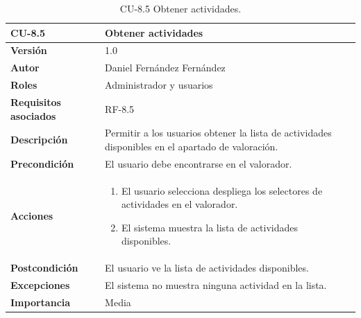 \begin{table}[p]
        \centering
        \begin{tabularx}{\linewidth}{ p{} p{} }
            \toprule
            \textbf{CU-8.5} & \textbf{Obtener actividades}\\
            \toprule
            \textbf{Versión} & 1.0 \\
            \textbf{Autor} & Daniel Fernández Fernández \\
            \textbf{Roles} & Administrador y usuarios \\
            \textbf{Requisitos asociados} & RF-8.5 \\
            \textbf{Descripción} & Permitir a los usuarios obtener la lista de actividades disponibles en el apartado de valoración. \\
            \textbf{Precondición} & El usuario debe encontrarse en el valorador. \\
            \textbf{Acciones} &
            \begin{enumerate}
            \def\labelenumi{\arabic{enumi}.}
            \tightlist
            \item El usuario selecciona despliega los selectores de actividades en el valorador.
            \item El sistema muestra la lista de actividades disponibles.
            \end{enumerate}\\
            \textbf{Postcondición} & El usuario ve la lista de actividades disponibles. \\
            \textbf{Excepciones} & El sistema no muestra ninguna actividad en la lista. \\
            \textbf{Importancia} & Media \\
            \bottomrule
        \end{tabularx}
        \caption{CU-8.5 Obtener actividades.}
\end{table}


